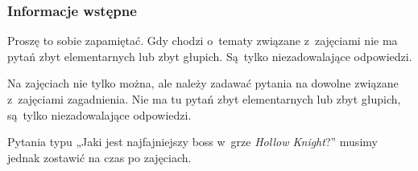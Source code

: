 \documentclass[10pt,t]{beamer}
\begin{document}
\begin{frame}
  \frametitle{Informacje wstępne}





  Proszę to sobie zapamiętać. Gdy chodzi o~tematy związane z~zajęciami
  \alert{nie} ma pytań zbyt elementarnych lub zbyt głupich. Są~tylko
  niezadowalające odpowiedzi.

  Na zajęciach nie tylko można, ale \alert{należy} zadawać pytania
  na dowolne związane z~zajęciami zagadnienia. Nie ma tu pytań zbyt
  elementarnych lub zbyt głupich, są~tylko niezadowalające odpowiedzi.

  Pytania typu „Jaki jest najfajniejszy boss w~grze \textit{Hollow
    Knight}?” musimy jednak zostawić na czas po zajęciach.

\end{frame}
\end{document}
